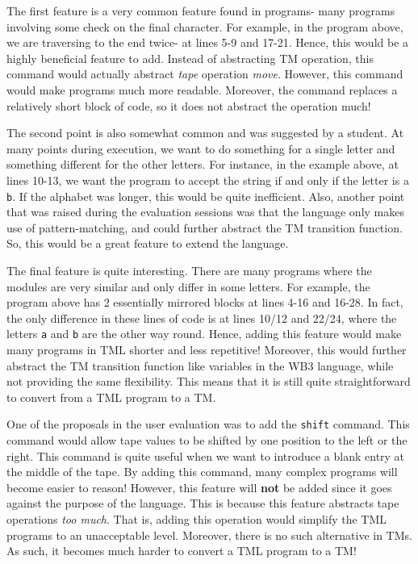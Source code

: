 The first feature is a very common feature found in programs- many programs involving some check on the final character. For example, in the program above, we are traversing to the end twice- at lines 5-9 and 17-21. Hence, this would be a highly beneficial feature to add. Instead of abstracting TM operation, this command would actually abstract \textit{tape} operation \emph{move}. However, this command would make programs much more readable. Moreover, the command replaces a relatively short block of code, so it does not abstract the operation much!

The second point is also somewhat common and was suggested by a student. At many points during execution, we want to do something for a single letter and something different for the other letters. For instance, in the example above, at lines 10-13, we want the program to accept the string if and only if the letter is a \texttt{b}. If the alphabet was longer, this would be quite inefficient. Also, another point that was raised during the evaluation sessions was that the language only makes use of pattern-matching, and could further abstract the TM transition function. So, this would be a great feature to extend the language. 

The final feature is quite interesting. There are many programs where the modules are very similar and only differ in some letters. For example, the program above has 2 essentially mirrored blocks at lines 4-16 and 16-28. In fact, the only difference in these lines of code is at lines 10/12 and 22/24, where the letters \texttt{a} and \texttt{b} are the other way round. Hence, adding this feature would make many programs in TML shorter and less repetitive! Moreover, this would further abstract the TM transition function like variables in the WB3 language, while not providing the same flexibility. This means that it is still quite straightforward to convert from a TML program to a TM.

One of the proposals in the user evaluation was to add the \texttt{shift} command. This command would allow tape values to be shifted by one position to the left or the right. This command is quite useful when we want to introduce a blank entry at the middle of the tape. By adding this command, many complex programs will become easier to reason! However, this feature will \textbf{not} be added since it goes against the purpose of the language. This is because this feature abstracts tape operations \textit{too much}. That is, adding this operation would simplify the TML programs to an unacceptable level. Moreover, there is no such alternative in TMs. As such, it becomes much harder to convert a TML program to a TM!

